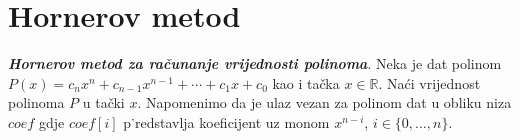  \section{Hornerov metod}
\begin{definition}
	\textbf{\textit{Hornerov metod za računanje vrijednosti polinoma}}. Neka je dat polinom $P(x)=c_n x^n + c_{n-1}x^{n-1} + \cdots + c_1 x + c_0$ kao i tačka $x \in \mathbb{R}$. Naći vrijednost polinoma $P$ u tački $x$. Napomenimo da je ulaz vezan za polinom dat u obliku niza $ coef$ gdje   $coef[i]$ p˙redstavlja koeficijent uz monom  $x^{n-i}$, $i \in \{0, \ldots, n\}$. 

\end{definition}

